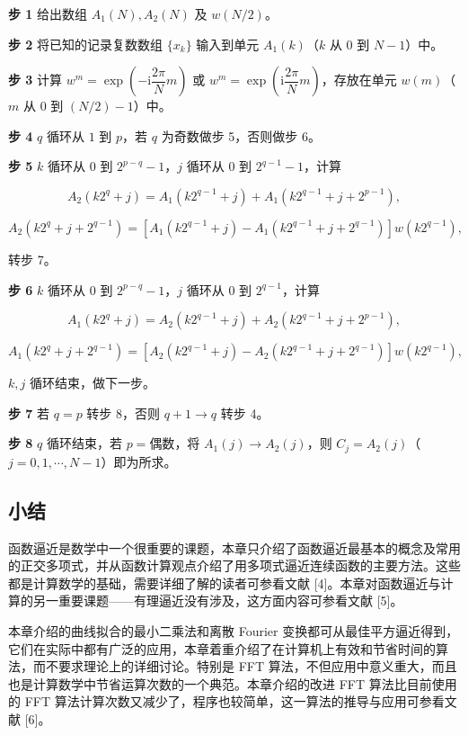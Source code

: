 \textbf{步 1} 给出数组 \(A_1(N),A_2(N)\) 及 \(w(N/2)\)。

\textbf{步 2} 将已知的记录复数数组 \(\{x_k\}\) 输入到单元 \(A_1(k)\)（\(k\) 从 \(0\) 到 \(N-1\)）中。

\textbf{步 3} 计算 \(w^m=\exp\left(-\mathrm i\dfrac{2\pi}{N}m\right)\) 或 \(w^m=\exp\left(\mathrm i\dfrac{2\pi}{N}m\right)\)，存放在单元 \(w(m)\)（\(m\) 从 \(0\) 到 \((N/2)-1\)）中。

\textbf{步 4} \(q\) 循环从 \(1\) 到 \(p\)，若 \(q\) 为奇数做步 5，否则做步 6。

\textbf{步 5} \(k\) 循环从 \(0\) 到 \(2^{p-q}-1\)，\(j\) 循环从 \(0\) 到 \(2^{q-1}-1\)，计算

\[
A_2(k2^q+j)=A_1(k2^{q-1}+j)+A_1(k2^{q-1}+j+2^{p-1}),
\]

\[
A_2(k2^q+j+2^{q-1})=[A_1(k2^{q-1}+j)-A_1(k2^{q-1}+j+2^{q-1})]w(k2^{q-1}),
\]

转步 7。

\textbf{步 6} \(k\) 循环从 \(0\) 到 \(2^{p-q}-1\)，\(j\) 循环从 \(0\) 到 \(2^{q-1}\)，计算

\[
A_1(k2^q+j)=A_2(k2^{q-1}+j)+A_2(k2^{q-1}+j+2^{p-1}),
\]

\[
A_1(k2^q+j+2^{q-1})=[A_2(k2^{q-1}+j)-A_2(k2^{q-1}+j+2^{q-1})]w(k2^{q-1}),
\]

\(k,j\) 循环结束，做下一步。

\textbf{步 7} 若 \(q=p\) 转步 8，否则 \(q+1\to q\) 转步 4。

\textbf{步 8} \(q\) 循环结束，若 \(p=\text{偶数}\)，将 \(A_1(j)\to A_2(j)\)，则 \(C_j=A_2(j)\)（\(j=0,1,\cdots,N-1\)）即为所求。

\subsection{小结}\label{ch03b-ux5c0fux7ed3}

函数逼近是数学中一个很重要的课题，本章只介绍了函数逼近最基本的概念及常用的正交多项式，并从函数计算观点介绍了用多项式逼近连续函数的主要方法。这些都是计算数学的基础，需要详细了解的读者可参看文献 {[}4{]}。本章对函数逼近与计算的另一重要课题------有理逼近没有涉及，这方面内容可参看文献 {[}5{]}。

本章介绍的曲线拟合的最小二乘法和离散 Fourier 变换都可从最佳平方逼近得到，它们在实际中都有广泛的应用，本章着重介绍了在计算机上有效和节省时间的算法，而不要求理论上的详细讨论。特别是 FFT 算法，不但应用中意义重大，而且也是计算数学中节省运算次数的一个典范。本章介绍的改进 FFT 算法比目前使用的 FFT 算法计算次数又减少了，程序也较简单，这一算法的推导与应用可参看文献 {[}6{]}。

